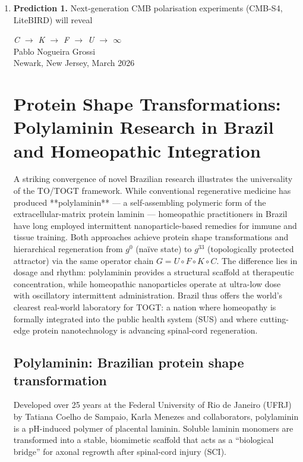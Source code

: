 \documentclass[19pt]{book}
\theoremstyle{plain}
\theoremstyle{definition}
\theoremstyle{remark}
\begin{document}
\begin{enumerate}
\item \textbf{Prediction 1.} Next-generation CMB polarisation experiments (CMB-S4, LiteBIRD) will reveal

\bigskip
\begin{flushright}
\textit{C \;$\to$\; K \;$\to$\; F \;$\to$\; U \;$\to$\; $\infty$}\\[0.3em]
Pablo Nogueira Grossi\\
Newark, New Jersey, March 2026
\end{flushright}
\chapter{Protein Shape Transformations: Polylaminin Research in Brazil and Homeopathic Integration}

A striking convergence of novel Brazilian research illustrates the universality of the TO/TOGT framework. While conventional regenerative medicine has produced **polylaminin** — a self-assembling polymeric form of the extracellular-matrix protein laminin — homeopathic practitioners in Brazil have long employed intermittent nanoparticle-based remedies for immune and tissue training. Both approaches achieve protein shape transformations and hierarchical regeneration from \(g^0\) (naïve state) to \(g^{33}\) (topologically protected attractor) via the same operator chain \(G = U \circ F \circ K \circ C\). The difference lies in dosage and rhythm: polylaminin provides a structural scaffold at therapeutic concentration, while homeopathic nanoparticles operate at ultra-low dose with oscillatory intermittent administration. Brazil thus offers the world’s clearest real-world laboratory for TOGT: a nation where homeopathy is formally integrated into the public health system (SUS) and where cutting-edge protein nanotechnology is advancing spinal-cord regeneration.

\section{Polylaminin: Brazilian protein shape transformation}

Developed over 25 years at the Federal University of Rio de Janeiro (UFRJ) by Tatiana Coelho de Sampaio, Karla Menezes and collaborators, polylaminin is a pH-induced polymer of placental laminin. Soluble laminin monomers are transformed into a stable, biomimetic scaffold that acts as a “biological bridge” for axonal regrowth after spinal-cord injury (SCI).


\end{enumerate}
\end{document}
